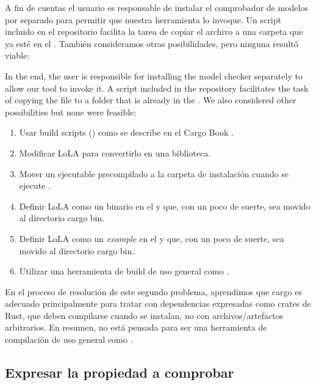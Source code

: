 A fin de cuentas el usuario es responsable de instalar el comprobador de modelos por separado para
permitir que nuestra herramienta lo invoque.
Un script 
incluido en el repositorio facilita la tarea de copiar el archivo
a una carpeta que ya esté en el .
También consideramos otras posibilidades, pero ninguna resultó viable:

In the end, the user is responsible for installing the model checker separately
to allow our tool to invoke it.
A script  included in the repository
facilitates the task of copying the file to a folder that is already in the .
We also considered other possibilities but none were feasible:

\begin{enumerate}
  \item Usar build scripts () como se describe en el Cargo Book \cite[Chap. 3.8]{cargo-book}.
  \item Modificar \acrshort{LoLA} para convertirlo en una biblioteca.
  \item Mover un ejecutable precompilado a la carpeta de instalación cuando se ejecute .
  \item Definir \acrshort{LoLA} como un binario en el  \cite[Chap 3.2.1]{cargo-book}
        y que, con un poco de suerte, sea movido al directorio cargo bin.
  \item Definir \acrshort{LoLA} como un \emph{example} en el  \cite[Chap 3.2.1]{cargo-book}
        y que, con un poco de suerte, sea movido al directorio cargo bin.
  \item Utilizar una herramienta de build de uso general como .
\end{enumerate}

En el proceso de resolución de este segundo problema, aprendimos que cargo es adecuado
principalmente para tratar con dependencias expresadas como crates de Rust, que deben
compilarse cuando se instalan, no con archivos/artefactos arbitrarios.
En resumen, no está pensada para ser una herramienta de compilación de uso general como .

\subsection{Expresar la propiedad a comprobar}

